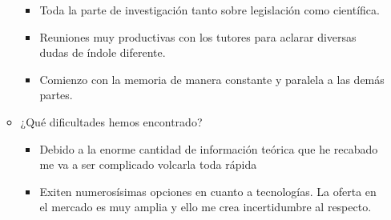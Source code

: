 \begin{enumerate}
\begin{itemize}
\begin{itemize}
			\item Toda la parte de investigación tanto sobre legislación como científica.
			\item Reuniones muy productivas con los tutores para aclarar diversas dudas de índole diferente.
			\item Comienzo con la memoria de manera constante y paralela a las demás partes.
		\end{itemize}
		\item ¿Qué dificultades hemos encontrado?
		\begin{itemize}
			\item Debido a la enorme cantidad de información teórica que he recabado me va a ser complicado volcarla toda rápida
			\item Exiten numerosísimas opciones en cuanto a tecnologías. La oferta en el mercado es muy amplia y ello me crea  incertidumbre al respecto.
		\end{itemize}
	\end{itemize}	
\end{enumerate}

